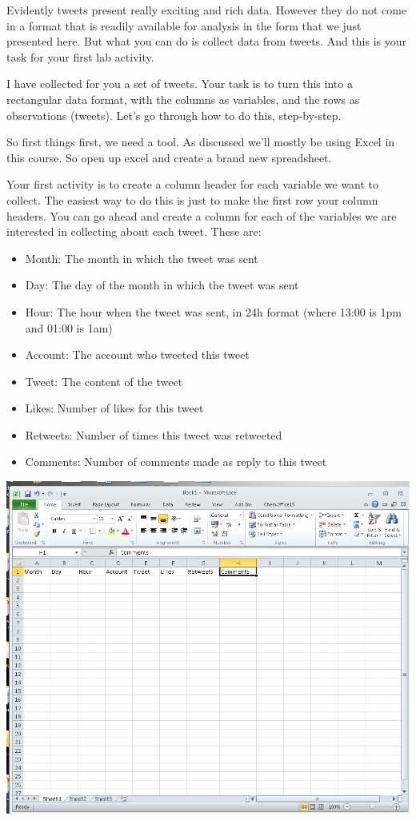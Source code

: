 \documentclass[
]{book}
\providecommand{\tightlist}{%
  \setlength{\itemsep}{0pt}\setlength{\parskip}{0pt}}
\begin{document}
Evidently tweets present really exciting and rich data. However they do not come in a format that is readily available for analysis in the form that we just presented here. But what you can do is collect data from tweets. And this is your task for your first lab activity.

I have collected for you a set of tweets. Your task is to turn this into a rectangular data format, with the columns as variables, and the rows as observations (tweets). Let's go through how to do this, step-by-step.

So first things first, we need a tool. As discussed we'll mostly be using Excel in this course. So open up excel and create a brand new spreadsheet.

Your first activity is to create a column header for each variable we want to collect. The easiest way to do this is just to make the first row your column headers. You can go ahead and create a column for each of the variables we are interested in collecting about each tweet. These are:

\begin{itemize}
\tightlist
\item
  Month: The month in which the tweet was sent
\item
  Day: The day of the month in which the tweet was sent
\item
  Hour: The hour when the tweet was sent, in 24h format (where 13:00 is 1pm and 01:00 is 1am)
\item
  Account: The account who tweeted this tweet
\item
  Tweet: The content of the tweet
\item
  Likes: Number of likes for this tweet
\item
  Retweets: Number of times this tweet was retweeted
\item
  Comments: Number of comments made as reply to this tweet
\end{itemize}

\includegraphics{imgs/column_headers_tweets.png}
\end{document}
